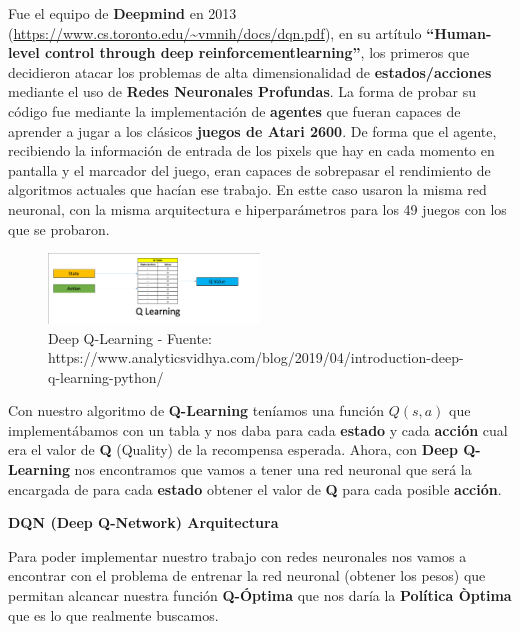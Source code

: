 \documentclass[
  a4paper,
  DIV=11,
  numbers=noendperiod]{scrreprt}
\begin{document}
Fue el equipo de \textbf{Deepmind} en 2013
(\url{https://www.cs.toronto.edu/~vmnih/docs/dqn.pdf}), en su artítulo
\textbf{``Human-level control through deep reinforcementlearning''}, los
primeros que decidieron atacar los problemas de alta dimensionalidad de
\textbf{estados/acciones} mediante el uso de \textbf{Redes Neuronales
Profundas}. La forma de probar su código fue mediante la implementación
de \textbf{agentes} que fueran capaces de aprender a jugar a los
clásicos \textbf{juegos de Atari 2600}. De forma que el agente,
recibiendo la información de entrada de los pixels que hay en cada
momento en pantalla y el marcador del juego, eran capaces de sobrepasar
el rendimiento de algoritmos actuales que hacían ese trabajo. En estte
caso usaron la misma red neuronal, con la misma arquitectura e
hiperparámetros para los 49 juegos con los que se probaron.

\begin{figure}

{\centering \includegraphics[width=0.5\textwidth,height=\textheight]{imagenes/reinforcement_learning/rl_qlearning.png}

}

\caption{Deep Q-Learning - Fuente:
https://www.analyticsvidhya.com/blog/2019/04/introduction-deep-q-learning-python/}

\end{figure}

Con nuestro algoritmo de \textbf{Q-Learning} teníamos una función
\(Q(s,a)\) que implementábamos con un tabla y nos daba para cada
\textbf{estado} y cada \textbf{acción} cual era el valor de \textbf{Q}
(Quality) de la recompensa esperada. Ahora, con \textbf{Deep Q-Learning}
nos encontramos que vamos a tener una red neuronal que será la encargada
de para cada \textbf{estado} obtener el valor de \textbf{Q} para cada
posible \textbf{acción}.

\textbf{DQN (Deep Q-Network) Arquitectura}

Para poder implementar nuestro trabajo con redes neuronales nos vamos a
encontrar con el problema de entrenar la red neuronal (obtener los
pesos) que permitan alcancar nuestra función \textbf{Q-Óptima} que nos
daría la \textbf{Política Òptima} que es lo que realmente buscamos.
\end{document}
